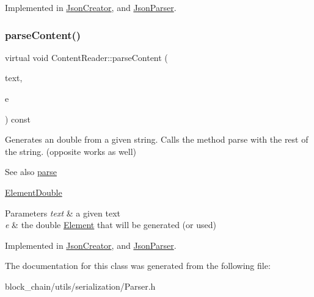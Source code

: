 Implemented in \mbox{\hyperlink{classJsonCreator_a9f57af1a7925074b8e3e4175f74c886a}{Json\+Creator}}, and \mbox{\hyperlink{classJsonParser_a7d4fad0f0947a74ca158dc1922c97355}{Json\+Parser}}.

\mbox{\label{classContentReader_ab4ba739ee5241848ae8af86e64e43a40}} 
\subsubsection{\texorpdfstring{parse\+Content()}{parseContent()}\hspace{0.1cm}{\footnotesize\ttfamily [6/6]}}
{\footnotesize\ttfamily virtual void Content\+Reader\+::parse\+Content (\begin{DoxyParamCaption}\item[{std\+::string \&}]{text,  }\item[{\mbox{\hyperlink{classElementDouble}{Element\+Double}} $\ast$}]{e }\end{DoxyParamCaption}) const\hspace{0.3cm}{\ttfamily [pure virtual]}}

Generates an double from a given string. Calls the method parse with the rest of the string. (opposite works as well) \begin{DoxySeeAlso}{See also}
\mbox{\hyperlink{classContentReader_a7fff2e63a2e8fa216665604f69974e1d}{parse}} 

\mbox{\hyperlink{classElementDouble}{Element\+Double}}
\end{DoxySeeAlso}

\begin{DoxyParams}{Parameters}
{\em text} & a given text \\
\hline
{\em e} & the double \mbox{\hyperlink{classElement}{Element}} that will be generated (or used) \\
\hline
\end{DoxyParams}


Implemented in \mbox{\hyperlink{classJsonCreator_a5e841806165fd5cb595d9f7d7c924080}{Json\+Creator}}, and \mbox{\hyperlink{classJsonParser_a07a4f2b10547d5f2251bc1f7b09d02c1}{Json\+Parser}}.



The documentation for this class was generated from the following file\+:\begin{DoxyCompactItemize}
\item 
block\+\_\+chain/utils/serialization/Parser.\+h\end{DoxyCompactItemize}
